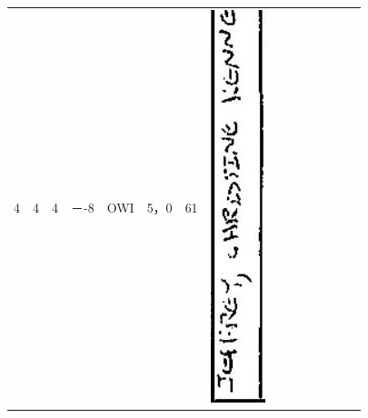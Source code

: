 \documentclass[10pt]{article}
\begin{document}
\begin{center}
\begin{tabular}{|c|c|c|c|c|c|c|c|c|c|c|c|c|c|c|}
\hline
4 & 4 & 4 & －-8 & OWI & 5，0 & 61 & \includegraphics[max width=\textwidth]{2025_02_27_dd68c3d38de88f0516d9g-009(7)}

\end{tabular}
\end{center}
\end{document}
